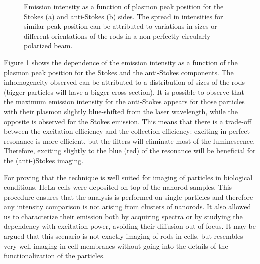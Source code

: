 \documentclass[journal=nalefd,manuscript=letter]{achemso}
\begin{document}
\begin{figure}[htp]
\centering
	\caption{Emission intensity as a function of plasmon peak position for the
	Stokes (a) and anti-Stokes (b) sides. The spread in intensities for similar
	peak position can be attributed to variations in sizes or different
	orientations of the rods in a non perfectly circularly polarized beam.}
	\label{fig:emission_peak_position}
\end{figure}

Figure \ref{fig:emission_peak_position} shows the dependence of the emission
intensity as a function of the plasmon peak position for the Stokes and the
anti-Stokes components. The inhomogeneity observed can be attributed to a
distribution of sizes of the rods (bigger particles will have a bigger cross
section). It is possible to observe that the maximum emission intensity for the
anti-Stokes appears for those particles with their plasmon slightly blue-shifted
from the laser wavelength, while the opposite is observed for the Stokes
emission. This means that there is a trade-off between the excitation efficiency
and the collection efficiency: exciting in perfect resonance is more efficient,
but the filters will eliminate most of the luminescence. Therefore, exciting
slightly to the blue (red) of the resonance will be beneficial for the
(anti-)Stokes imaging.

For proving that the technique is well suited for imaging of particles in
biological conditions, HeLa cells were deposited on top of the nanorod samples.
This procedure ensures that the analysis is performed on single-particles and
therefore any intensity comparison is not arising from clusters of nanorods.
It also allowed us to characterize their emission both by acquiring spectra or
by studying the dependency with excitation power, avoiding their diffusion out
of focus. It may be argued that this scenario is not exactly imaging of rods in
cells, but resembles very well imaging in cell membranes without going into the
details of the functionalization of the particles.
\end{document}
